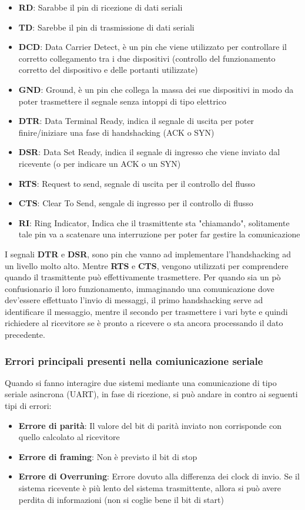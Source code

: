 \begin{itemize}
    \item \textbf{RD}: Sarabbe il pin di ricezione di dati seriali
    \item \textbf{TD}: Sarebbe il pin di trasmissione di dati seriali
    \item \textbf{DCD}: Data Carrier Detect, è un pin che viene utilizzato per controllare il corretto collegamento tra i due dispositivi (controllo del funzionamento corretto del dispositivo e delle portanti utilizzate)
    \item \textbf{GND}: Ground, è un pin che collega la massa dei sue dispositivi in modo da poter trasmettere il segnale senza intoppi di tipo elettrico
    \item \textbf{DTR}: Data Terminal Ready, indica il segnale di uscita per poter finire/iniziare una fase di handshacking (ACK o SYN)
    \item \textbf{DSR}: Data Set Ready, indica il segnale di ingresso che viene inviato dal ricevente (o per indicare un ACK o un SYN)
    \item \textbf{RTS}: Request to send, segnale di uscita per il controllo del flusso
    \item \textbf{CTS}: Clear To Send, sengale di ingresso per il controllo di flusso
    \item \textbf{RI}: Ring Indicator, Indica che il trasmittente sta "chiamando", solitamente tale pin va a scatenare una interruzione per poter far gestire la comunicazione
\end{itemize}
I segnali \textbf{DTR} e \textbf{DSR}, sono pin che vanno ad implementare l'handshacking ad un livello molto alto. Mentre \textbf{RTS} e \textbf{CTS}, vengono utilizzati per comprendere quando il trasmittente può effettivamente trasmettere. Per quando sia un pò confusionario il loro funzionamento, immaginando una comunicazione dove dev'essere effettuato l'invio di messaggi, il primo handshacking serve ad identificare il messaggio, mentre il secondo per trasmettere i vari byte e quindi richiedere al ricevitore se è pronto a ricevere o sta ancora processando il dato precedente.

\subsubsection{Errori principali presenti nella comiunicazione seriale}
Quando si fanno interagire due sistemi mediante una comunicazione di tipo seriale asincrona (UART), in fase di ricezione, si può andare in contro ai seguenti tipi di errori:
\begin{itemize}
    \item \textbf{Errore di parità}: Il valore del bit di parità inviato non corrisponde con quello calcolato al ricevitore
    \item \textbf{Errore di framing}: Non è previsto il bit di stop
    \item \textbf{Errore di Overruning}: Errore dovuto alla differenza dei clock di invio. Se il sistema ricevente è più lento del sistema trasmittente, allora si può avere perdita di informazioni (non si coglie bene il bit di start)
\end{itemize}

